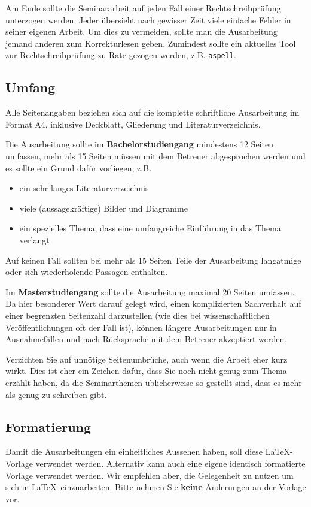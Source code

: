 \documentclass[final,bibliography=totocnumbered]{include/sikseminar}
\begin{document}
Am Ende sollte die Seminararbeit auf jeden Fall einer Rechtschreibprüfung unterzogen werden. Jeder übersieht nach gewisser Zeit viele einfache Fehler in seiner eigenen Arbeit. Um dies zu vermeiden, sollte man die Ausarbeitung jemand anderen zum Korrekturlesen geben. Zumindest sollte ein aktuelles Tool zur Rechtschreibprüfung zu Rate gezogen werden, z.B. \texttt{aspell}.



\subsection{Umfang}
\label{hinweise:umfang}
Alle Seitenangaben beziehen sich auf die komplette schriftliche Ausarbeitung im Format A4, inklusive Deckblatt, Gliederung und Literaturverzeichnis.

Die Ausarbeitung sollte im \textbf{Bachelorstudiengang} mindestens 12 Seiten umfassen, mehr als 15 Seiten müssen mit dem Betreuer abgesprochen werden und es sollte ein Grund dafür vorliegen, z.B.
\begin{itemize}
  \item ein sehr langes Literaturverzeichnis
  \item viele (aussagekräftige) Bilder und Diagramme
  \item ein spezielles Thema, dass eine umfangreiche Einführung in das Thema verlangt
\end{itemize}
Auf keinen Fall sollten bei mehr als 15 Seiten Teile der Ausarbeitung langatmige oder sich wiederholende Passagen enthalten.

Im \textbf{Masterstudiengang} sollte die Ausarbeitung maximal 20 Seiten umfassen. Da hier besonderer Wert darauf gelegt wird, einen komplizierten Sachverhalt auf einer begrenzten Seitenzahl darzustellen (wie dies bei wissenschaftlichen Veröffentlichungen oft der Fall ist), können längere Ausarbeitungen nur in Ausnahmefällen und nach Rücksprache mit dem Betreuer akzeptiert werden.

Verzichten Sie auf unnötige Seitenumbrüche, auch wenn die Arbeit eher kurz wirkt. Dies ist eher ein Zeichen dafür, dass Sie noch nicht genug zum Thema erzählt haben, da die Seminarthemen üblicherweise so gestellt sind, dass es mehr als genug zu schreiben gibt.


\subsection{Formatierung}
Damit die Ausarbeitungen ein einheitliches Aussehen haben, soll diese \LaTeX-Vorlage verwendet werden. Alternativ kann auch eine eigene identisch formatierte Vorlage verwendet werden. Wir empfehlen aber, die Gelegenheit zu nutzen um sich in \LaTeX\ einzuarbeiten. Bitte nehmen Sie \textbf{keine} Änderungen an der Vorlage vor.
\end{document}
